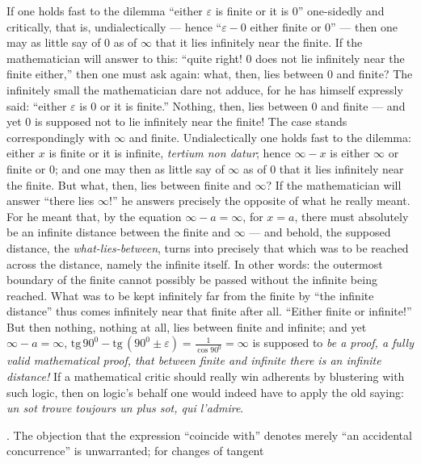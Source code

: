 \documentclass[12pt,a4paper]{book}
\begin{document}
{%
\par If one holds fast to the dilemma ``either $\varepsilon$ is finite or it is
$0$'' one-sidedly and critically, that is, undialectically --- hence
``$\varepsilon - 0$ either finite or $0$'' --- then one may as little say of
$0$ as of $\infty$ that it lies infinitely near the finite. If the
mathematician will answer to this: ``quite right! $0$ does not lie infinitely
near the finite either,'' then one must ask again: what, then, lies between $0$
and finite? The infinitely small the mathematician dare not adduce, for he has
himself expressly said: ``either $\varepsilon$ is $0$ or it is finite.''
Nothing, then, lies between $0$ and finite --- and yet $0$ is supposed not to
lie infinitely near the finite! The case stands correspondingly with $\infty$
and finite. Undialectically one holds fast to the dilemma: either $x$ is finite
or it is infinite, \textit{tertium non datur}; hence $\infty - x$ is either
$\infty$ or finite or $0$; and one may then as little say of $\infty$ as of
$0$ that it lies infinitely near the finite. But what, then, lies between
finite and $\infty$? If the mathematician will answer ``there lies $\infty$!''
he answers precisely the opposite of what he really meant. For he meant that,
by the equation $\infty - a = \infty$, for $x = a$, there must absolutely be an
infinite distance between the finite and $\infty$ --- and behold, the supposed
distance, the \emph{what-lies-between}, turns into precisely that which was to
be reached across the distance, namely the infinite itself. In other words: the
outermost boundary of the finite cannot possibly be passed without the infinite
being reached. What was to be kept infinitely far from the finite by ``the
infinite distance'' thus comes infinitely near that finite after all. ``Either
finite or infinite!'' But then nothing, nothing at all, lies between finite and
infinite; and yet $\infty - a = \infty$,
$\mathrm{tg}\,90^{0} - \mathrm{tg}\,(90^{0} \pm \varepsilon) =
\frac{1}{\cos 90^{0}} = \infty$ is supposed to \emph{be a proof, a fully valid
mathematical proof, that between finite and infinite there is an infinite
distance!} If a mathematical critic should really win adherents by blustering
with such logic, then on logic's behalf one would indeed have to apply the old
saying: \textit{un sot trouve toujours un plus sot, qui l'admire}.}. The
objection that the expression ``coincide with'' denotes merely ``an accidental
concurrence'' is unwarranted; for changes of tangent
\end{document}
